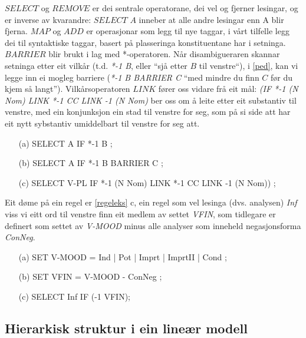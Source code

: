\documentclass[a4paper,norsk]{article}
\begin{document}
$SELECT$ og $REMOVE$ er dei sentrale operatorane, dei vel og fjerner lesingar, og er inverse av kvarandre: $SELECT$ $A$ inneber at alle andre lesingar enn A blir fjerna. $MAP$ og $ADD$ er operasjonar som legg til nye taggar, i vårt tilfelle legg dei til syntaktiske taggar, basert på plasseringa konstituentane har i setninga. $BARRIER$ blir brukt i lag med *-operatoren. Når disambigueraren skannar setninga etter eit vilkår (t.d. \textit{*-1 B}, eller ``sjå etter $B$ til venstre``), i \ref{ped}, kan vi legge inn ei mogleg barriere  (\textit{*-1 B BARRIER C} ``med mindre du finn $C$ før du kjem så langt''). Vilkårsoperatoren $LINK$ fører oss vidare frå eit mål: \textit{(IF *-1 (N Nom) LINK *-1 CC LINK -1 (N Nom)} ber oss om å leite etter eit substantiv til venstre, med ein konjunksjon ein stad til venstre for seg, som på si side att har eit nytt sybstantiv umiddelbart til venstre for seg att.%

\begin{example}\label{ped}
\begin{itemize}
\item[(a)] SELECT A IF *-1 B ;
\item[(b)] SELECT A IF *-1 B BARRIER C ;
\item[(c)] SELECT V-PL IF *-1 (N Nom) LINK *-1 CC LINK -1 (N Nom)) ;
\end{itemize}
\end{example}

Eit døme på ein regel er \ref{regeleks} c, ein regel som vel lesinga (dvs. analysen) \emph{Inf} viss vi eitt ord til venstre finn eit medlem av settet \emph{VFIN}, som  tidlegare er definert som settet av \emph{V-MOOD} minus alle analyser som inneheld negasjonsforma \emph{ConNeg}.%

\begin{example}\label{regeleks}
\begin{itemize}
\item[(a)] SET V-MOOD = Ind | Pot | Imprt | ImprtII | Cond ; 
\item[(b)] SET VFIN  =  V-MOOD - ConNeg ; 
\item[(c)] SELECT Inf IF (-1 VFIN); 
\end{itemize}
\end{example}%

\subsection{Hierarkisk struktur i ein lineær modell}
\end{document}
